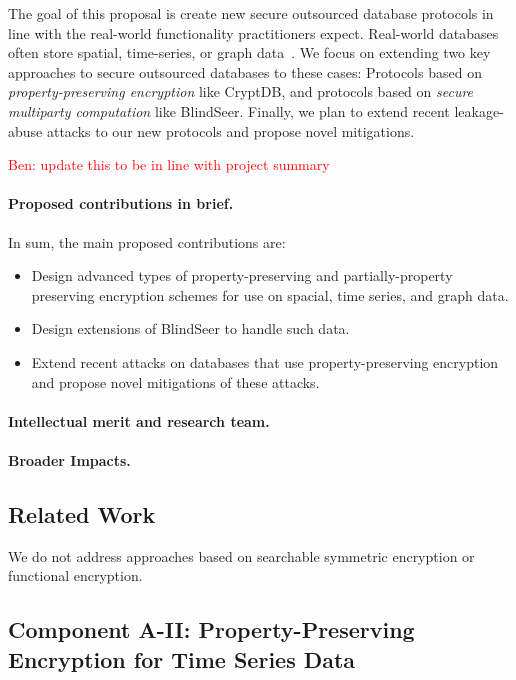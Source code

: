\documentclass[11pt]{article}
\newcommand{\ben}[1]{\textcolor{red}{Ben: #1}}
\theoremstyle{remark}
\begin{document}
The goal of this proposal is create new secure outsourced database protocols in line with the real-world functionality practitioners expect.  Real-world databases often store spatial, time-series, or graph data~\cite{SP:FVYSHG17}.  We focus on extending two key approaches to secure outsourced databases to these cases: Protocols based on \emph{property-preserving encryption} like CryptDB, and protocols based on \emph{secure multiparty computation} like BlindSeer.  Finally, we plan to extend recent leakage-abuse attacks to our new protocols and propose novel mitigations.

\ben{update this to be in line with project summary}

\paragraph*{Proposed contributions in brief.}
In sum, the main proposed contributions are:
\begin{itemize}
\item Design advanced types of property-preserving and partially-property preserving encryption schemes for use on spacial, time series, and graph data.
\item Design extensions of BlindSeer to handle such data.
\item Extend recent attacks on databases that use property-preserving encryption and propose novel mitigations of these attacks. 
\end{itemize}

\paragraph*{Intellectual merit and research team.}  

 \paragraph*{Broader Impacts.}

\subsection{Related Work}

We do not address approaches based on searchable symmetric encryption or functional encryption.  




\subsection{Component A-II:  Property-Preserving Encryption for Time Series Data} 
\end{document}
